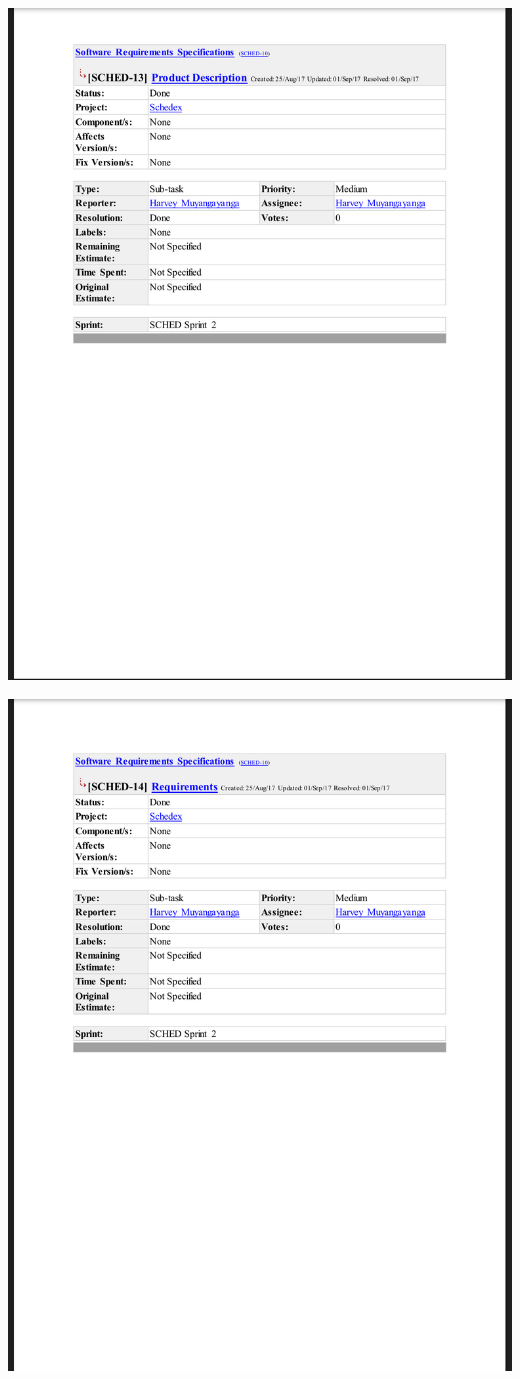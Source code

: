\documentclass{article}
\begin{document}
\centerline{\includegraphics[scale=0.4]{sprint2_8}}

\centerline{\includegraphics[scale=0.4]{sprint2_9}}
\end{document}

